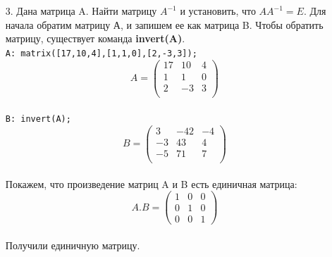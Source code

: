 \documentclass[article, bachelor, och, pract]{SCWorks}
\begin{document}
\begin{itemize}
\item[3.] Дана матрица A. Найти матрицу \(A^{-1}\) и установить, что \(AA^{-1}=E\). Для начала обратим матрицу А, и запишем ее как матрица B. Чтобы обратить матрицу, существует команда \textbf{invert(A)}.\\
\texttt{A: matrix([17,10,4],[1,1,0],[2,-3,3]);}\\
$$A=\begin{pmatrix}
17 & 10 & 4 \\
1 & 1 & 0 \\
2 & -3 & 3 \\
\end{pmatrix}
$$\\

\texttt{B: invert(A);}\\
$$B=\begin{pmatrix}
3 & -42 & -4 \\
-3 & 43 & 4 \\
-5 & 71 & 7 \\
\end{pmatrix}$$\\
Покажем, что произведение матриц A и B есть единичная матрица:\\
$$A.B=\begin{pmatrix}
1 & 0 & 0\\
0 & 1 & 0\\
0 & 0 & 1
\end{pmatrix}$$\\
Получили единичную матрицу.
\end{itemize}

\newpage
\end{document}
